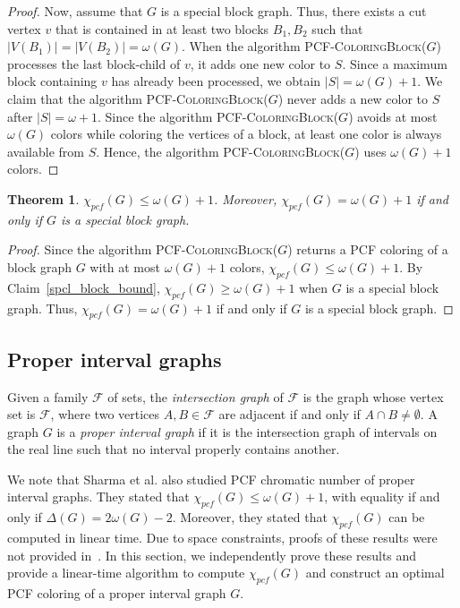 \documentclass[11pt]{article}
\theoremstyle{plain}
\newtheorem{theorem}{Theorem}
\begin{document}
\begin{proof}
		\medskip
		
		Now, assume that $G$ is a special block graph. Thus, there exists a cut vertex $v$ that is contained in at least two blocks $B_1,B_2$ such that $|V(B_1)| = |V(B_2)| = \omega(G)$. When the algorithm \textsc{PCF-ColoringBlock($G$)} processes the last block-child of $v$, it adds one new color to $S$. Since a maximum block containing $v$ has already been processed, we obtain $|S|=\omega(G)+1$. 
		We claim that the algorithm \textsc{PCF-ColoringBlock($G$)} never adds a new color to $S$ after $|S|=\omega+1$. 
		Since the algorithm \textsc{PCF-ColoringBlock($G$)} avoids at most $\omega(G)$ colors while coloring the vertices of a block, at least one color is always available from $S$.
		Hence, the algorithm \textsc{PCF-ColoringBlock($G$)} uses $\omega(G)+1$ colors.
	\end{proof}
	
	\begin{theorem}\label{block_bound_char}
		$\chi_{pcf}(G)\leq\omega(G)+1$. Moreover, $\chi_{pcf}(G)=\omega(G)+1$ if and only if $G$ is a special block graph.
	\end{theorem}
	\begin{proof}
		Since the algorithm \textsc{PCF-ColoringBlock($G$)} returns a PCF coloring of a block graph $G$ with at most $\omega(G)+1$ colors, $\chi_{pcf}(G) \leq \omega(G)+1$. By Claim~\ref{spcl_block_bound}, $\chi_{pcf}(G)\geq \omega(G)+1$ when $G$ is a special block graph. Thus, $\chi_{pcf}(G)=\omega(G)+1$ if and only if $G$ is a special block graph.
	\end{proof}
	
	
	\subsection{Proper interval graphs}
	
	Given a family $\mathcal{F}$ of sets, the \emph{intersection graph} of $\mathcal{F}$ is the graph whose vertex set is $\mathcal{F}$, where two vertices $A,B\in\mathcal{F}$ are adjacent if and only if $A\cap B\neq\emptyset$. 
	A graph $G$ is a \emph{proper interval graph} if it is the intersection graph of intervals on the real line such that no interval properly contains another.
	
	\medskip
	
	We note that Sharma et al. \cite{SPP} also studied PCF chromatic number of proper interval graphs. They stated that $\chi_{pcf}(G)\leq \omega(G)+1$, with equality if and only if $\Delta(G)=2\omega(G)-2$. Moreover, they stated that $\chi_{pcf}(G)$ can be computed in linear time. Due to space constraints, proofs of these results were not provided in~\cite{SPP}. In this section, we independently prove these results and provide a linear-time algorithm to compute $\chi_{pcf}(G)$ and construct an optimal PCF coloring of a proper interval graph $G$.
		
\end{document}
